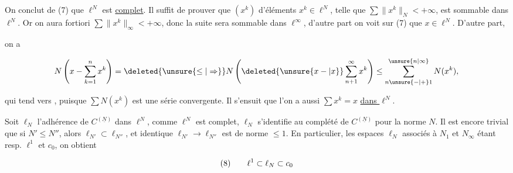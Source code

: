 

\reversemarginpar{}\normalmarginpar


On conclut de (7) que $\ell^N$ est \uline{complet}. Il suffit de prouver que   $(x^k)$  d'éléments $x^k\in\ell^N$, telle que $\sum\lVert x^{k}\rVert_N<+\infty$, est sommable dans $\ell^N$. Or  on aura  fortiori $\sum\lVert x^k\rVert_\infty<+\infty$, donc la  suite sera sommable dans $\ell^\infty$,  d'autre part on  voit sur (7) que $x\in\ell^N$. D'autre part,

{\reversemarginpar{}}

on a

\[
N\left(x-\sum_{k=1}^n x^k\right)=\deleted{\unsure{\leq|\Rightarrow}}N\left(\deleted{\unsure{x-|x}}\sum_{n+1}^\infty x^k\right)\leq\sum_{n\unsure{-|+}1}^{\unsure{n|\infty}}N(x^k),
\]

qui tend vers , puisque $\sum N(x^k)$ est une série convergente. Il s'ensuit que l'on a aussi $\sum x^k=x$ \uline{dans $\ell^N$}.

Soit $\ell_N$ l'adhérence de $C^{(\underline N)}$ dans $\ell^N$, comme $\ell^N$ est complet, $\ell_N$ s'identifie au complété de $C^{(\underline N)}$ pour la norme $N$. Il est encore trivial que si $N'\leq N''$, alors $\ell_{N'}\subset\ell_{N''}$, et  identique $\ell_{N'}\to\ell_{N''}$ est de norme $\leq 1$. En particulier, les espaces $\ell_N$ associés à $N_1$ et $N_\infty$ étant resp. $\ell^1$ et $c_0$, on obtient

\[
\begin{array}{@{}l@{\qquad}l@{}}
(8)&\displaystyle \ell^1\subset\ell_N\subset c_0
\end{array}
\]

